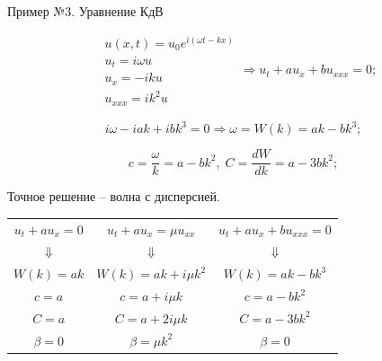 \documentclass[10pt,xcolor=pst,aspectratio=169]{beamer}
\begin{document}
\begin{frame}{Пример №3. Уравнение КдВ}

    \transdissolve[duration=0.1]
    \justifying
    \large

    \[
        \boxed{
            \begin{split}
                &u \left( x, t \right) = u_{0} e^{i \left( \omega t - k x \right)} \\
                &u_{t} = i \omega u \\
                &u_{x} = - i k u \\
                &u_{xxx} = i k^{2} u
            \end{split}
        }
        \Rightarrow
        \boxed{
            u_{t} + a u_{x} + b u_{xxx} = 0
        };
    \]

    \[
        i \omega - i a k + i b k^{3} = 0
        \Rightarrow
        \omega = W \left( k \right) = a k - \boxed{b k^{3}};
    \]

    \[
        c = \frac{\omega}{k} = a - \boxed{ b k^{2}}, \; C = \frac{d W}{d k} = a - \boxed{3 b k^{2}};
    \]

    \begin{center}
        Точное решение -- волна с дисперсией.
    \end{center}

\end{frame}

\begin{frame}{}

    \transdissolve[duration=0.1]
    \justifying
    \large

    \begin{center}
        \begin{tabular}{|c|c|c|}
            $u_{t} + a u_{x} = 0$
            &
            $u_{t} + a u_{x} = \boxed{\mu u_{xx}}$
            &
            $u_{t} + a u_{x} + \boxed{b u_{xxx}} = 0$
            \\
            $\Downarrow$ & $\Downarrow$ & $\Downarrow$
            \\
            $
                W \left( k \right) = a k
            $
            &
            $
                W \left( k \right) = a k + \boxed{i \mu k^{2}}
            $
            &
            $
                W \left( k \right) = a k - \boxed{b k^{3}}
            $
            \\
            $c = a$
            &
            $c = a + \boxed{i \mu k}$
            &
            $c = a - \boxed{ b k^{2}}$
            \\
            $C = a$
            &
            $C = a + \boxed{2 i \mu k}$
            &
            $C = a - \boxed{3 b k^{2}}$
            \\
            $\beta = 0$
            &
            $\beta = \mu k^{2}$
            &
            $\beta = 0$
            \\
        \end{tabular}
    \end{center}

\end{frame}
\end{document}
